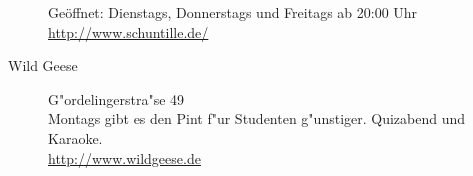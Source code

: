 \begin{description}
   Geöffnet: Dienstags, Donnerstags und Freitags ab 20:00 Uhr
   \url{http://www.schuntille.de/}
   \item[Wild Geese] \hfill G"ordelingerstra"se 49\\
Montags gibt es den Pint f"ur Studenten g"unstiger.
Quizabend und Karaoke.\\
\url{http://www.wildgeese.de}

\end{description}
\newpage

